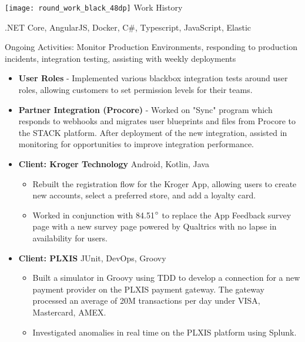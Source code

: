 {\noindent \texttt{[image: round\_work\_black\_48dp]} \hspace{0.25pc}  \large Work History}\hspace{1pc}{\noindent\rule{36.75pc}{0.4pt}}

\vspace{1pc}


{\color{gray} .NET Core, AngularJS, Docker, C\#, Typescript, JavaScript, Elastic}

    Ongoing Activities: Monitor Production Environments, responding to production incidents, integration testing, assisting with weekly deployments
\begin{itemize}
	\item \textbf{User Roles} - Implemented various blackbox integration tests around user roles, allowing customers to set permission levels for their teams.
	\item \textbf{Partner Integration (Procore)} - Worked on "Sync" program which responds to webhooks and migrates user blueprints and files from Procore to the STACK platform.
	After deployment of the new integration, assisted in monitoring for opportunities to improve integration performance.
\end{itemize}


\begin{itemize}
	\item \textbf{Client: Kroger Technology} \hspace{0.5pc} {\color{gray}Android, Kotlin, Java}
	\begin{itemize}
		\item Rebuilt the registration flow for the Kroger App, allowing users to create new accounts, select a preferred store, and add a loyalty card. 
		
		\item Worked in conjunction with 84.51$\degree$ to replace the App Feedback survey page with a new survey page powered by Qualtrics with no lapse in availability for users.
	\end{itemize}
	\item \textbf{Client: PLXIS} \hspace{0.5pc} {\color{gray} JUnit, DevOps, Groovy}
	\begin{itemize}
		\item Built a simulator in Groovy using TDD to develop a connection for a new payment provider on the PLXIS payment gateway. The gateway processed an average of 20M transactions per day under VISA, Mastercard, AMEX.
		
		\item Investigated anomalies in real time on the PLXIS platform using Splunk.
	\end{itemize}
	
\end{itemize}

